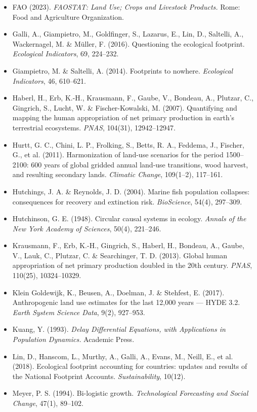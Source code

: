 \documentclass[11pt]{article}
\begin{document}
\begin{itemize}
\item FAO (2023). \emph{FAOSTAT: Land Use; Crops and Livestock Products.} Rome: Food and Agriculture Organization.
\item Galli, A., Giampietro, M., Goldfinger, S., Lazarus, E., Lin, D., Saltelli, A., Wackernagel, M. \& M\"uller, F. (2016). Questioning the ecological footprint. \emph{Ecological Indicators}, 69, 224--232.
\item Giampietro, M. \& Saltelli, A. (2014). Footprints to nowhere. \emph{Ecological Indicators}, 46, 610--621.
\item Haberl, H., Erb, K.-H., Krausmann, F., Gaube, V., Bondeau, A., Plutzar, C., Gingrich, S., Lucht, W. \& Fischer-Kowalski, M. (2007). Quantifying and mapping the human appropriation of net primary production in earth's terrestrial ecosystems. \emph{PNAS}, 104(31), 12942--12947.
\item Hurtt, G. C., Chini, L. P., Frolking, S., Betts, R. A., Feddema, J., Fischer, G., et al. (2011). Harmonization of land-use scenarios for the period 1500--2100: 600 years of global gridded annual land-use transitions, wood harvest, and resulting secondary lands. \emph{Climatic Change}, 109(1--2), 117--161.
\item Hutchings, J. A. \& Reynolds, J. D. (2004). Marine fish population collapses: consequences for recovery and extinction risk. \emph{BioScience}, 54(4), 297--309.
\item Hutchinson, G. E. (1948). Circular causal systems in ecology. \emph{Annals of the New York Academy of Sciences}, 50(4), 221--246.
\item Krausmann, F., Erb, K.-H., Gingrich, S., Haberl, H., Bondeau, A., Gaube, V., Lauk, C., Plutzar, C. \& Searchinger, T. D. (2013). Global human appropriation of net primary production doubled in the 20th century. \emph{PNAS}, 110(25), 10324--10329.
\item Klein Goldewijk, K., Beusen, A., Doelman, J. \& Stehfest, E. (2017). Anthropogenic land use estimates for the last 12,000 years --- HYDE 3.2. \emph{Earth System Science Data}, 9(2), 927--953.
\item Kuang, Y. (1993). \emph{Delay Differential Equations, with Applications in Population Dynamics.} Academic Press.
\item Lin, D., Hanscom, L., Murthy, A., Galli, A., Evans, M., Neill, E., et al. (2018). Ecological footprint accounting for countries: updates and results of the National Footprint Accounts. \emph{Sustainability}, 10(12).
\item Meyer, P. S. (1994). Bi-logistic growth. \emph{Technological Forecasting and Social Change}, 47(1), 89--102.

\end{itemize}
\end{document}
